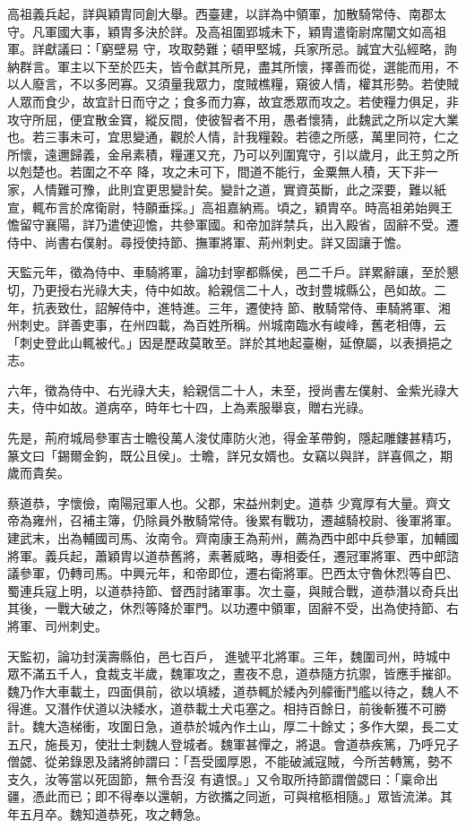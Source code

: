 \begin{pinyinscope}
 高祖義兵起，詳與穎胄同創大舉。西臺建，以詳為中領軍，加散騎常侍、南郡太守。凡軍國大事，穎胄多決於詳。及高祖圍郢城未下，穎胄遣衛尉席闡文如高祖軍。詳獻議曰：「窮壁易
 守，攻取勢難；頓甲堅城，兵家所忌。誠宜大弘經略，詢納群言。軍主以下至於匹夫，皆令獻其所見，盡其所懷，擇善而從，選能而用，不以人廢言，不以多罔寡。又須量我眾力，度賊樵糧，窺彼人情，權其形勢。若使賊人眾而食少，故宜計日而守之；食多而力寡，故宜悉眾而攻之。若使糧力俱足，非攻守所屈，便宜散金寶，縱反間，使彼智者不用，愚者懷猜，此魏武之所以定大業也。若三事未可，宜思變通，觀於人情，計我糧穀。若德之所感，萬里同符，仁之所懷，遠邇歸義，金帛素積，糧運又充，乃可以列圍寬守，引以歲月，此王剪之所以剋楚也。若圍之不卒
 降，攻之未可下，間道不能行，金粟無人積，天下非一家，人情難可豫，此則宜更思變計矣。變計之道，實資英斷，此之深要，難以紙宣，輒布言於席衛尉，特願垂採。」高祖嘉納焉。頃之，穎胄卒。時高祖弟始興王憺留守襄陽，詳乃遣使迎憺，共參軍國。和帝加詳禁兵，出入殿省，固辭不受。遷侍中、尚書右僕射。尋授使持節、撫軍將軍、荊州刺史。詳又固讓于憺。



 天監元年，徵為侍中、車騎將軍，論功封寧都縣侯，邑二千戶。詳累辭讓，至於懇切，乃更授右光祿大夫，侍中如故。給親信二十人，改封豊城縣公，邑如故。二年，抗表致仕，詔解侍中，進特進。三年，遷使持
 節、散騎常侍、車騎將軍、湘州刺史。詳善吏事，在州四載，為百姓所稱。州城南臨水有峻峰，舊老相傳，云「刺史登此山輒被代。」因是歷政莫敢至。詳於其地起臺榭，延僚屬，以表損挹之志。



 六年，徵為侍中、右光祿大夫，給親信二十人，未至，授尚書左僕射、金紫光祿大夫，侍中如故。道病卒，時年七十四，上為素服舉哀，贈右光祿。



 先是，荊府城局參軍吉士瞻役萬人浚仗庫防火池，得金革帶鉤，隱起雕鏤甚精巧，篆文曰「錫爾金鉤，既公且侯」。士瞻，詳兄女婿也。女竊以與詳，詳喜佩之，期歲而貴矣。



 蔡道恭，字懷儉，南陽冠軍人也。父郡，宋益州刺史。道恭
 少寬厚有大量。齊文帝為雍州，召補主簿，仍除員外散騎常侍。後累有戰功，遷越騎校尉、後軍將軍。建武末，出為輔國司馬、汝南令。齊南康王為荊州，薦為西中郎中兵參軍，加輔國將軍。義兵起，蕭穎胄以道恭舊將，素著威略，專相委任，遷冠軍將軍、西中郎諮議參軍，仍轉司馬。中興元年，和帝即位，遷右衛將軍。巴西太守魯休烈等自巴、蜀連兵寇上明，以道恭持節、督西討諸軍事。次土臺，與賊合戰，道恭潛以奇兵出其後，一戰大破之，休烈等降於軍門。以功遷中領軍，固辭不受，出為使持節、右將軍、司州刺史。



 天監初，論功封漢壽縣伯，邑七百戶，
 進號平北將軍。三年，魏圍司州，時城中眾不滿五千人，食裁支半歲，魏軍攻之，晝夜不息，道恭隨方抗禦，皆應手摧卻。魏乃作大車載土，四面俱前，欲以填緌，道恭輒於緌內列艨衝鬥艦以待之，魏人不得進。又潛作伏道以決緌水，道恭載土犬屯塞之。相持百餘日，前後斬獲不可勝計。魏大造梯衝，攻圍日急，道恭於城內作土山，厚二十餘丈；多作大槊，長二丈五尺，施長刃，使壯士刺魏人登城者。魏軍甚憚之，將退。會道恭疾篤，乃呼兄子僧勰、從弟錄恩及諸將帥謂曰：「吾受國厚恩，不能破滅寇賊，今所苦轉篤，勢不支久，汝等當以死固節，無令吾沒
 有遺恨。」又令取所持節謂僧勰曰：「稟命出疆，憑此而已；即不得奉以還朝，方欲攜之同逝，可與棺柩相隨。」眾皆流涕。其年五月卒。魏知道恭死，攻之轉急。




\end{pinyinscope}

